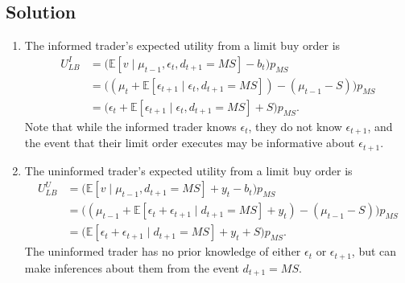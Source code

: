 \documentclass[a4paper]{article}
\begin{document}
\subsection*{Solution}
\begin{enumerate}
	\item The informed trader's expected utility from a limit buy order is
	\begin{align}
		U^I_{LB}
		&= \Big( \mathbb{E}[v \mid \mu_{t-1}, \epsilon_t, d_{t+1}=MS] - b_t \Big) p_{MS} 
		\nonumber
		\\
		&= \Big( (\mu_t + \mathbb{E}[\epsilon_{t+1} \mid \epsilon_t, d_{t+1}=MS]) - (\mu_{t-1} - S) \Big) p_{MS}
		\nonumber
		\\
		&= \Big( \epsilon_t + \mathbb{E}[\epsilon_{t+1} \mid \epsilon_t, d_{t+1}=MS] + S \Big) p_{MS}.
		\label{eq:uilb}
	\end{align}
	Note that while the informed trader knows $\epsilon_t$, they do not know $\epsilon_{t+1}$, and the event that their limit order executes may be informative about $\epsilon_{t+1}$.
	
	\item The uninformed trader's expected utility from a limit buy order is
	\begin{align}
		U^U_{LB}
		&= \Big( \mathbb{E}[v \mid \mu_{t-1}, d_{t+1}=MS] + y_t - b_t \Big) p_{MS} 
		\nonumber
		\\
		&= \Big( (\mu_{t-1} + \mathbb{E}[\epsilon_{t} + \epsilon_{t+1} \mid d_{t+1}=MS] + y_t) - (\mu_{t-1} - S) \Big) p_{MS}
		\nonumber
		\\
		&= \Big( \mathbb{E}[\epsilon_{t} + \epsilon_{t+1} \mid d_{t+1}=MS] + y_t + S \Big) p_{MS}.
		\label{eq:uulb}
	\end{align}
	The uninformed trader has no prior knowledge of either $\epsilon_t$ or $\epsilon_{t+1}$, but can make inferences about them from the event $d_{t+1} = MS$.
	

\end{enumerate}
\end{document}
